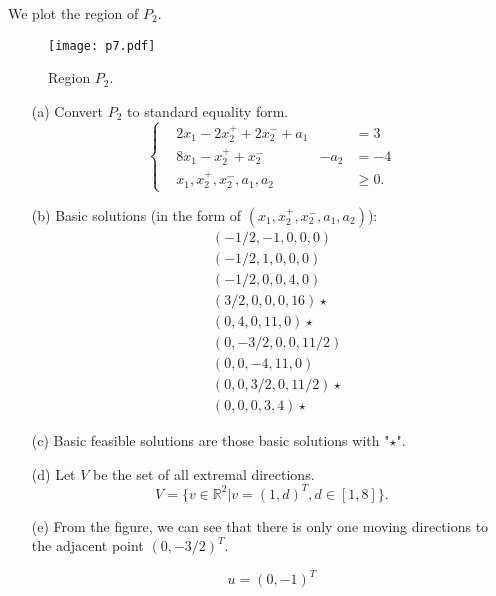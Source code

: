 \documentclass[12pt]{article}
\begin{document}
We plot the region of $P_2$.

\begin{figure}[htbp]
  \caption{Region $P_2$.}
  \centering
    \texttt{[image: p7.pdf]}
\end{figure}

\FloatBarrier

\begin{enumerate}
\item [(a)]
Convert $P_2$ to standard equality form.
$$
\left\{
\begin{aligned}
& 2x_1 - 2x_2^+ + 2x_2^- + a_1 & & = 3 \\
& 8x_1 - x_2^+ + x_2^-   & -a_2 & = -4 \\
& x_1, x_2^+, x_2^-, a_1, a_2 & & \geqslant 0.
\end{aligned}
\right.
$$

\item[(b)]
Basic solutions (in the form of $(x_1, x_2^+, x_2^-, a_1, a_2)$): 
$$
\begin{aligned}
&(-1/2, -1, 0, 0, 0)   \\ 
&(-1/2, 1, 0, 0, 0) \\ 
&(-1/2, 0, 0, 4, 0) \\
& (3/2, 0, 0, 0, 16) \star \\ 
 &(0, 4, 0, 11, 0) \star \\
 & (0, -3/2, 0, 0, 11/2) \\
 & (0, 0, -4, 11, 0) \\
& (0, 0, 3/2, 0, 11/2) \star \\
& (0, 0, 0, 3, 4) \star
\end{aligned}
$$

\item[(c)]
Basic feasible solutions are those basic solutions with "$\star$".

\item[(d)]
Let $V$ be the set of all extremal directions. 
$$
V = \{v \in\mathbb R^2| v = (1, d)^T, d\in [1, 8] \}.
$$

\item[(e)]
From the figure, we can see that there is only one moving directions to the adjacent point $(0, -3/2)^T$. 

$$
u = (0, -1)^T
$$
\end{enumerate}
\end{document}
